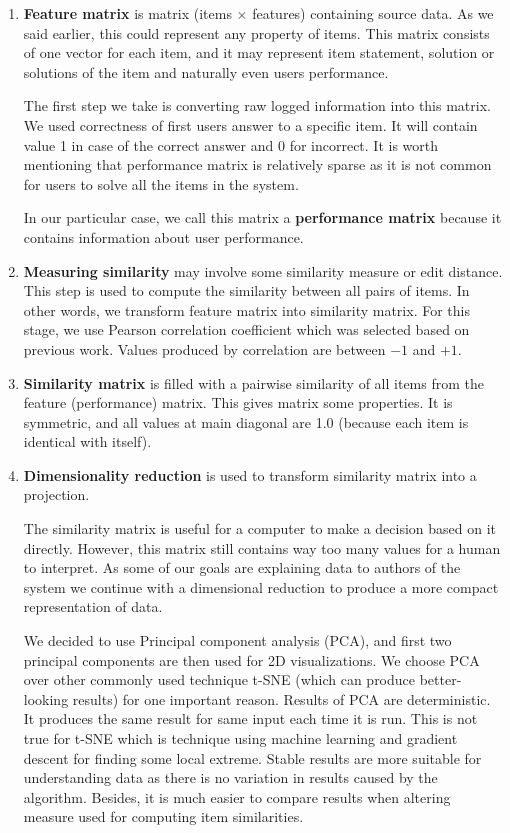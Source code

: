 \documentclass[
  digital, %
  table,   %
  nolof,     %
  nolot,     %
  nocover,
  color,
  final, %
]{fithesis3}
\begin{document}
\begin{enumerate}
  \item
    \textbf{Feature matrix} is matrix (items $\times$ features) containing source data. As we said earlier, this could represent any property of items. This matrix consists of one vector for each item, and it may represent item statement, solution or solutions of the item and naturally even users performance. 

    The first step we take is converting raw logged information into this matrix. We used correctness of first users answer to a specific item. It will contain value 1 in case of the correct answer and 0 for incorrect. It is worth mentioning that performance matrix is relatively sparse as it is not common for users to solve all the items in the system.

    In our particular case, we call this matrix a \textbf{performance matrix} because it contains information about user performance.

  \item
    \textbf{Measuring similarity} may involve some similarity measure or edit distance. This step is used to compute the similarity between all pairs of items. In other words, we transform feature matrix into similarity matrix. For this stage, we use Pearson correlation coefficient which was selected based on previous work. Values produced by correlation are between $-1$ and $+1$.

  \item
    \textbf{Similarity matrix} is filled with a pairwise similarity of all items from the feature (performance) matrix. This gives matrix some properties. It is symmetric, and all values at main diagonal are 1.0 (because each item is identical with itself).

  \item
    \textbf{Dimensionality reduction} is used to transform similarity matrix into a projection.


    The similarity matrix is useful for a computer to make a decision based on it directly. However, this matrix still contains way too many values for a human to interpret. As some of our goals are explaining data to authors of the system we continue with a dimensional reduction to produce a more compact representation of data.


    We decided to use Principal component analysis (PCA), and first two principal components are then used for 2D visualizations. We choose PCA over other commonly used technique t-SNE (which can produce better-looking results) for one important reason. Results of PCA are deterministic. It produces the same result for same input each time it is run. This is not true for t-SNE which is technique using machine learning and gradient descent for finding some local extreme. Stable results are more suitable for understanding data as there is no variation in results caused by the algorithm. Besides, it is much easier to compare results when altering measure used for computing item similarities.


\end{enumerate}
\end{document}
